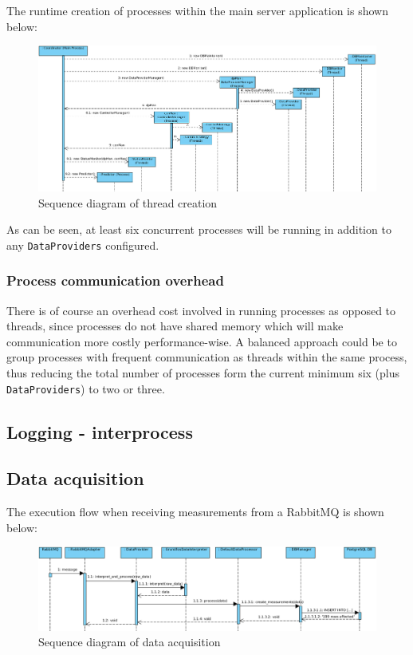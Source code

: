 The runtime creation of processes within the main server application is shown below:
\begin{figure}[H]
    \centering
    \includegraphics[width=\textwidth]{figures/seq_diagram}
    \caption{Sequence diagram of thread creation}
    \label{figureSeqDiagram}
\end{figure}
As can be seen, at least six concurrent processes will be running in addition to any \texttt{DataProviders} configured.


\subsubsection{Process communication overhead}
There is of course an overhead cost involved in running processes as opposed to threads, since processes do not have shared memory which will make communication more costly performance-wise. A balanced approach could be to group processes with frequent communication as threads within the same process, thus reducing the total number of processes form the current minimum six (plus \texttt{DataProviders}) to two or three. 

\subsection{Logging - interprocess}

\newpage
\subsection{Data acquisition}
The execution flow when receiving measurements from a RabbitMQ is shown below:
\begin{figure}[H]
    \centering
    \includegraphics[width=\textwidth]{figures/data_acq_seq_diagram}
    \caption{Sequence diagram of data acquisition}
    \label{figureSeqDiagram}
\end{figure}


